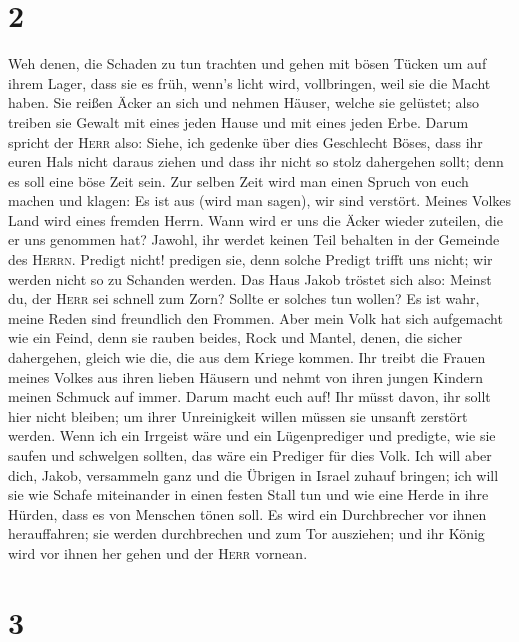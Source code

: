 \hypertarget{section-1}{%
\section{2}\label{section-1}}

 Weh denen, die Schaden zu tun trachten und gehen mit
bösen Tücken um auf ihrem Lager, dass sie es früh, wenn's licht wird,
vollbringen, weil sie die Macht haben.  Sie reißen Äcker
an sich und nehmen Häuser, welche sie gelüstet; also treiben sie Gewalt
mit eines jeden Hause und mit eines jeden Erbe.  Darum
spricht der \textsc{Herr} also: Siehe, ich gedenke über dies Geschlecht
Böses, dass ihr euren Hals nicht daraus ziehen und dass ihr nicht so
stolz dahergehen sollt; denn es soll eine böse Zeit sein. 
Zur selben Zeit wird man einen Spruch von euch machen und klagen: Es ist
aus (wird man sagen), wir sind verstört. Meines Volkes Land wird eines
fremden Herrn. Wann wird er uns die Äcker wieder zuteilen, die er uns
genommen hat?  Jawohl, ihr werdet keinen Teil behalten in
der Gemeinde des \textsc{Herrn}.  Predigt nicht! predigen
sie, denn solche Predigt trifft uns nicht; wir werden nicht so zu
Schanden werden.  Das Haus Jakob tröstet sich also: Meinst
du, der \textsc{Herr} sei schnell zum Zorn? Sollte er solches tun
wollen? Es ist wahr, meine Reden sind freundlich den Frommen.
 Aber mein Volk hat sich aufgemacht wie ein Feind, denn
sie rauben beides, Rock und Mantel, denen, die sicher dahergehen, gleich
wie die, die aus dem Kriege kommen.  Ihr treibt die Frauen
meines Volkes aus ihren lieben Häusern und nehmt von ihren jungen
Kindern meinen Schmuck auf immer.  Darum macht euch auf!
Ihr müsst davon, ihr sollt hier nicht bleiben; um ihrer Unreinigkeit
willen müssen sie unsanft zerstört werden.  Wenn ich ein
Irrgeist wäre und ein Lügenprediger und predigte, wie sie saufen und
schwelgen sollten, das wäre ein Prediger für dies Volk. 
Ich will aber dich, Jakob, versammeln ganz und die Übrigen in Israel
zuhauf bringen; ich will sie wie Schafe miteinander in einen festen
Stall tun und wie eine Herde in ihre Hürden, dass es von Menschen tönen
soll.  Es wird ein Durchbrecher vor ihnen herauffahren;
sie werden durchbrechen und zum Tor ausziehen; und ihr König wird vor
ihnen her gehen und der \textsc{Herr} vornean.

\hypertarget{section-2}{%
\section{3}\label{section-2}}

